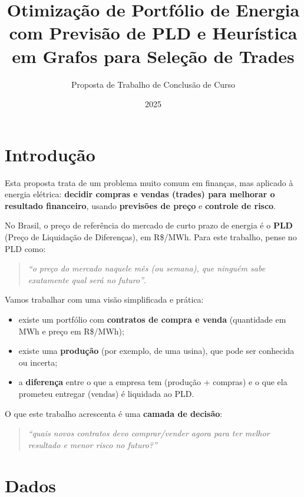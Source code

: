 \documentclass{article}
\title{Otimização de Portfólio de Energia com Previsão de PLD e Heurística em Grafos para Seleção de Trades}
\author{Proposta de Trabalho de Conclusão de Curso}
\date{2025}
\begin{document}
\maketitle

\section{Introdução}

Esta proposta trata de um problema muito comum em finanças, mas aplicado à energia elétrica:
\textbf{decidir compras e vendas (trades) para melhorar o resultado financeiro}, usando
\textbf{previsões de preço} e \textbf{controle de risco}.

No Brasil, o preço de referência do mercado de curto prazo de energia é o \textbf{PLD}
(Preço de Liquidação de Diferenças), em R\$/MWh. Para este trabalho, pense no PLD como:
\begin{quote}
\emph{``o preço do mercado naquele mês (ou semana), que ninguém sabe exatamente qual será no futuro''}.
\end{quote}

Vamos trabalhar com uma
visão simplificada e prática:
\begin{itemize}
    \item existe um portfólio com \textbf{contratos de compra e venda} (quantidade em MWh e preço em R\$/MWh);
    \item existe uma \textbf{produção} (por exemplo, de uma usina), que pode ser conhecida ou incerta;
    \item a \textbf{diferença} entre o que a empresa tem (produção + compras) e o que ela prometeu entregar (vendas)
    é liquidada ao PLD.
\end{itemize}

O que este trabalho acrescenta é uma \textbf{camada de decisão}:
\begin{quote}
\emph{``quais novos contratos devo comprar/vender agora para ter melhor resultado e menor risco no futuro?''}
\end{quote}

\section{Dados}
\end{document}
